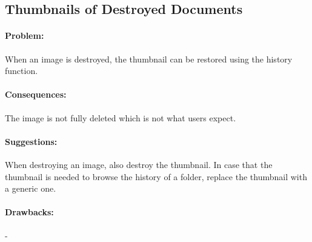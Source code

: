 \subsection{Thumbnails of Destroyed Documents}

\paragraph{Problem:}
When an image is destroyed, the thumbnail can be restored using the history function.

\paragraph{Consequences:}
The image is not fully deleted which is not what users expect.

\paragraph{Suggestions:}
When destroying an image, also destroy the thumbnail. In case that the thumbnail is needed to browse the history of a folder, replace the thumbnail with a generic one.

\paragraph{Drawbacks:} -

